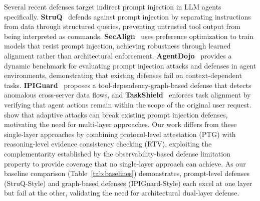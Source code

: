 Several recent defenses target indirect prompt injection in LLM agents specifically. \textbf{StruQ}~\citep{chen2024struq} defends against prompt injection by separating instructions from data through structured queries, preventing untrusted tool output from being interpreted as commands. \textbf{SecAlign}~\citep{chen2024secalign} uses preference optimization to train models that resist prompt injection, achieving robustness through learned alignment rather than architectural enforcement. \textbf{AgentDojo}~\citep{debenedetti2024agentdojo} provides a dynamic benchmark for evaluating prompt injection attacks and defenses in agent environments, demonstrating that existing defenses fail on context-dependent tasks. \textbf{IPIGuard}~\citep{an2025ipiguard} proposes a tool-dependency-graph-based defense that detects anomalous cross-server data flows, and \textbf{TaskShield}~\citep{jia2025task} enforces task alignment by verifying that agent actions remain within the scope of the original user request. \citet{zhan2025adaptive} show that adaptive attacks can break existing prompt injection defenses, motivating the need for multi-layer approaches. Our work differs from these single-layer approaches by combining protocol-level attestation (PTG) with reasoning-level evidence consistency checking (RTV), exploiting the complementarity established by the observability-based defense limitation property to provide coverage that no single-layer approach can achieve. As our baseline comparison (Table~\ref{tab:baselines}) demonstrates, prompt-level defenses (StruQ-Style) and graph-based defenses (IPIGuard-Style) each excel at one layer but fail at the other, validating the need for architectural dual-layer defense.